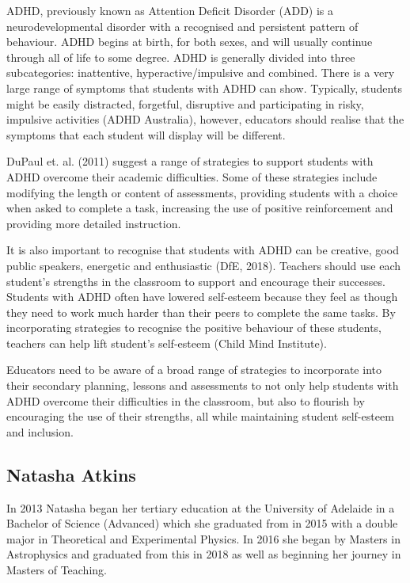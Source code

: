 \documentclass[twoside,14pt,a4paper,notitlepage]{memoir}
\begin{document}
ADHD, previously known as Attention Deficit Disorder (ADD) is a neurodevelopmental disorder with a recognised and persistent pattern of behaviour. ADHD begins at birth, for both sexes, and will usually continue through all of life to some degree. ADHD is generally divided into three subcategories: inattentive, hyperactive/impulsive and combined. There is a very large range of symptoms that students with ADHD can show. Typically, students might be easily distracted, forgetful, disruptive and participating in risky, impulsive activities (ADHD Australia), however, educators should realise that the symptoms that each student will display will be different.

DuPaul et. al. (2011) suggest a range of strategies to support students with ADHD overcome their academic difficulties. Some of these strategies include modifying the length or content of assessments, providing students with a choice when asked to complete a task, increasing the use of positive reinforcement and providing more detailed instruction.

It is also important to recognise that students with ADHD can be creative, good public speakers, energetic and enthusiastic (DfE, 2018). Teachers should use each student’s strengths in the classroom to support and encourage their successes. Students with ADHD often have lowered self-esteem because they feel as though they need to work much harder than their peers to complete the same tasks. By incorporating strategies to recognise the positive behaviour of these students, teachers can help lift student’s self-esteem (Child Mind Institute).

Educators need to be aware of a broad range of strategies to incorporate into their secondary planning, lessons and assessments to not only help students with ADHD overcome their difficulties in the classroom, but also to flourish by encouraging the use of their strengths, all while maintaining student self-esteem and inclusion.

\subsection*{Natasha Atkins}

In 2013 Natasha began her tertiary education at the University of Adelaide in a Bachelor of Science (Advanced) which she graduated from in 2015 with a double major in Theoretical and Experimental Physics. In 2016 she began by Masters in Astrophysics and graduated from this in 2018 as well as beginning her journey in Masters of Teaching. 
\end{document}

